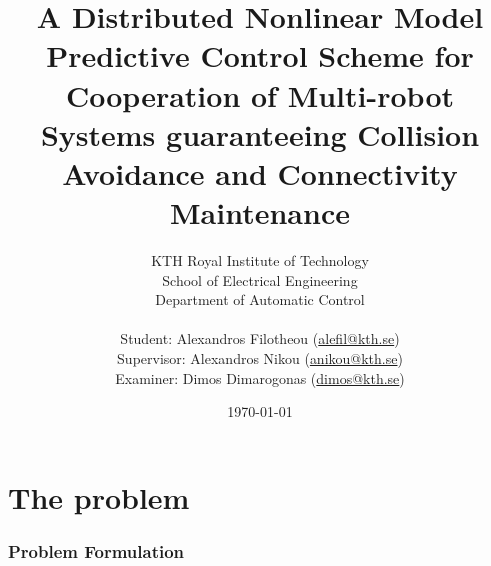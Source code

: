 \documentclass[a4paper,12pt,twoside]{article}
\title{\textbf{A Distributed Nonlinear Model Predictive Control Scheme for
Cooperation of Multi-robot Systems guaranteeing Collision Avoidance and
Connectivity Maintenance}}
\author{KTH Royal Institute of Technology \\
  School of Electrical Engineering \\
  Department of Automatic Control \\ \\
Student: Alexandros Filotheou (\href{mailto: alefil@kth.se}{alefil@kth.se}) \\
Supervisor: Alexandros Nikou (\href{mailto: anikou@kth.se}{anikou@kth.se}) \\
Examiner: Dimos Dimarogonas (\href{mailto: dimos@kth.se}{dimos@kth.se}) \\}
\date{\today}
\begin{document}
\maketitle


\newpage
\tableofcontents
\newpage




\part{The problem}




  \section{Problem Formulation}
    \label{sec:prob_formulation}
\end{document}
